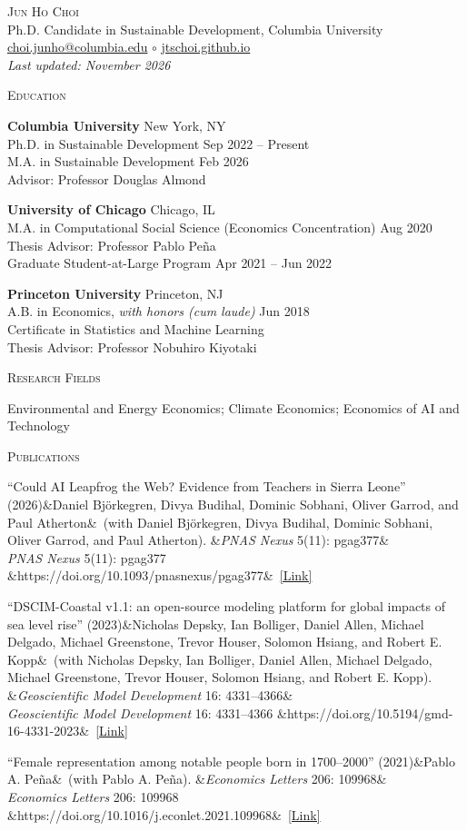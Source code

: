 \documentclass[11pt, letterpaper]{article}
\newcommand{\cvsection}[1]{%
    \par\vspace{9pt}%
    {\Large\scshape #1}\ \hrulefill\par\nopagebreak
    \vspace{3pt}%
}
\newcommand{\educationentry}[5]{%
    \textbf{#1} \hfill #2\\
    #3 \hfill #4\\
    #5\par\vspace{4pt}%
}
\newcommand{\paper}[5]{%
    ``#1'' (#3)\ifx&#2&\else\ (with #2)\fi.%
    \ifx&#4&\else\\ #4\fi%
    \ifx&#5&\else\ \href{#5}{[Link]}\fi%
    \par\vspace{4pt}%
}
\begin{document}
\begin{center}
    {\huge\scshape Jun Ho Choi}\\[5pt]
    \small
    Ph.D. Candidate in Sustainable Development, Columbia University\\
    \href{mailto:choi.junho@columbia.edu}{choi.junho@columbia.edu} $\circ$ \href{https://jtschoi.github.io/}{jtschoi.github.io}\\[2pt]
    \textit{Last updated: November 2026}
\end{center}


\cvsection{Education}

\educationentry{Columbia University}{New York, NY}
{Ph.D. in Sustainable Development}{Sep 2022 -- Present}
{M.A. in Sustainable Development \hfill Feb 2026\\
Advisor: Professor Douglas Almond}

\educationentry{University of Chicago}{Chicago, IL}
{M.A. in Computational Social Science (Economics Concentration)}{Aug 2020}
{Thesis Advisor: Professor Pablo Pe\~na\\
Graduate Student-at-Large Program \hfill Apr 2021 -- Jun 2022}

\educationentry{Princeton University}{Princeton, NJ}
{A.B. in Economics, \textit{with honors (cum laude)}}{Jun 2018}
{Certificate in Statistics and Machine Learning\\
Thesis Advisor: Professor Nobuhiro Kiyotaki}


\cvsection{Research Fields}

Environmental and Energy Economics; Climate Economics; Economics of AI and Technology


\cvsection{Publications}

\paper{Could AI Leapfrog the Web? Evidence from Teachers in Sierra Leone}
{Daniel Björkegren, Divya Budihal, Dominic Sobhani, Oliver Garrod, and Paul Atherton}
{2026}
{\textit{PNAS Nexus} 5(11): pgag377}
{https://doi.org/10.1093/pnasnexus/pgag377}

\paper{DSCIM-Coastal v1.1: an open-source modeling platform for global impacts of sea level rise}
{Nicholas Depsky, Ian Bolliger, Daniel Allen, Michael Delgado, Michael Greenstone, Trevor Houser, Solomon Hsiang, and Robert E. Kopp}
{2023}
{\textit{Geoscientific Model Development} 16: 4331--4366}
{https://doi.org/10.5194/gmd-16-4331-2023}

\paper{Female representation among notable people born in 1700--2000}
{Pablo A. Pe\~na}
{2021}
{\textit{Economics Letters} 206: 109968}
{https://doi.org/10.1016/j.econlet.2021.109968}
\end{document}
